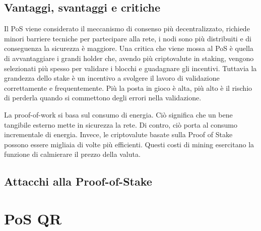 \subsection{Vantaggi, svantaggi e critiche}
Il PoS viene considerato il meccanismo di consenso più decentralizzato, richiede minori barriere tecniche per partecipare alla rete, i nodi sono più distribuiti e di conseguenza la sicurezza è maggiore. Una critica che viene mossa al PoS è quella di avvantaggiare i grandi holder che, avendo più criptovalute in staking, vengono selezionati più spesso per validare i blocchi e guadagnare gli incentivi. Tuttavia la grandezza dello stake è un incentivo a svolgere il lavoro di validazione correttamente e frequentemente. Più la posta in gioco è alta, più alto è il rischio di perderla quando si commettono degli errori nella validazione.

La proof-of-work si basa sul consumo di energia. Ciò significa che un bene tangibile esterno mette in sicurezza la rete. Di contro, ciò porta al consumo incrementale di energia. Invece, le criptovalute basate sulla Proof of Stake possono essere migliaia di volte più efficienti. Questi costi di mining esercitano la funzione di calmierare il prezzo della valuta.

\subsection{Attacchi alla Proof-of-Stake}

\section{PoS QR}
